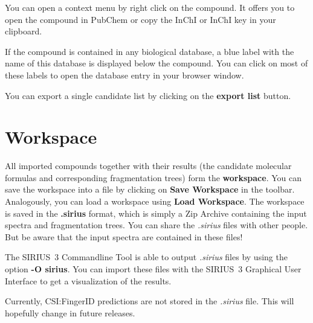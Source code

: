 \documentclass[letterpaper,10pt,openany,oneside]{sphinxmanual}
\begin{document}
You can open a context menu by right click on the compound. It offers you to open the compound in PubChem or copy the InChI or InChI key in your clipboard.

If the compound is contained in any biological database, a blue label with the name of this database is displayed below the compound. You can click on most of these labels to open the database entry in your browser window.

You can export a single candidate list by clicking on the \textbf{export list} button.



\section{Workspace}
\label{gui:workspace}

All imported compounds together with their results (the candidate molecular formulas and corresponding fragmentation trees) form the \textbf{workspace}. You can save the workspace into a file by clicking on \textbf{Save Workspace} in the toolbar. Analogously, you can load a workspace using \textbf{Load Workspace}. The workspace is saved in the \textbf{.sirius} format, which is simply a Zip Archive containing the input spectra and fragmentation trees. You can share the \emph{.sirius} files with other people. But be aware that the input spectra are contained in these files!

The SIRIUS~3 Commandline Tool is able to output \emph{.sirius} files by using the option \textbf{-O sirius}. You can import these files with the SIRIUS~3 Graphical User Interface to get a visualization of the results.

Currently, CSI:FingerID predictions are not stored in the \emph{.sirius} file. This will hopefully change in future releases.
\end{document}
